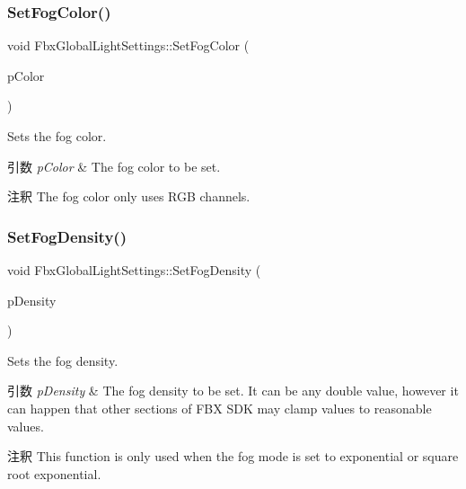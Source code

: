 \subsubsection{\texorpdfstring{Set\+Fog\+Color()}{SetFogColor()}}
{\footnotesize\ttfamily void Fbx\+Global\+Light\+Settings\+::\+Set\+Fog\+Color (\begin{DoxyParamCaption}\item[{\hyperlink{class_fbx_color}{Fbx\+Color}}]{p\+Color }\end{DoxyParamCaption})}

Sets the fog color. 
\begin{DoxyParams}{引数}
{\em p\+Color} & The fog color to be set. \\
\hline
\end{DoxyParams}
\begin{DoxyRemark}{注釈}
The fog color only uses R\+GB channels. 
\end{DoxyRemark}
\mbox{\label{class_fbx_global_light_settings_a9aa9fb5c44351b8b4ef9caf1968ca32f}} 
\subsubsection{\texorpdfstring{Set\+Fog\+Density()}{SetFogDensity()}}
{\footnotesize\ttfamily void Fbx\+Global\+Light\+Settings\+::\+Set\+Fog\+Density (\begin{DoxyParamCaption}\item[{double}]{p\+Density }\end{DoxyParamCaption})}

Sets the fog density. 
\begin{DoxyParams}{引数}
{\em p\+Density} & The fog density to be set. It can be any double value, however it can happen that other sections of F\+BX S\+DK may clamp values to reasonable values. \\
\hline
\end{DoxyParams}
\begin{DoxyRemark}{注釈}
This function is only used when the fog mode is set to exponential or square root exponential. 
\end{DoxyRemark}
\mbox{\label{class_fbx_global_light_settings_a8236e86da20394c673183e762760d6f0}} 
